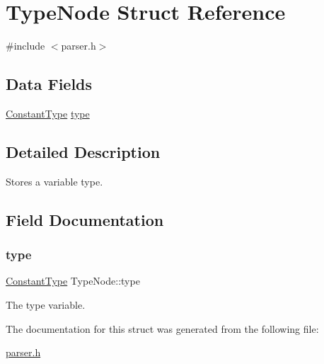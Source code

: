 \hypertarget{struct_type_node}{}\section{Type\+Node Struct Reference}
\label{struct_type_node}


{\ttfamily \#include $<$parser.\+h$>$}

\subsection*{Data Fields}
\begin{DoxyCompactItemize}
\item 
\hyperlink{parser_8h_a455cdd942ce73c87e99cb3f9d6a01926}{Constant\+Type} \hyperlink{struct_type_node_abd5fc196a6f39c15eb33e94eec269ac7}{type}
\end{DoxyCompactItemize}


\subsection{Detailed Description}
Stores a variable type. 

\subsection{Field Documentation}
\mbox{\label{struct_type_node_abd5fc196a6f39c15eb33e94eec269ac7}} 
\subsubsection{\texorpdfstring{type}{type}}
{\footnotesize\ttfamily \hyperlink{parser_8h_a455cdd942ce73c87e99cb3f9d6a01926}{Constant\+Type} Type\+Node\+::type}

The type variable. 

The documentation for this struct was generated from the following file\+:\begin{DoxyCompactItemize}
\item 
\hyperlink{parser_8h}{parser.\+h}\end{DoxyCompactItemize}
